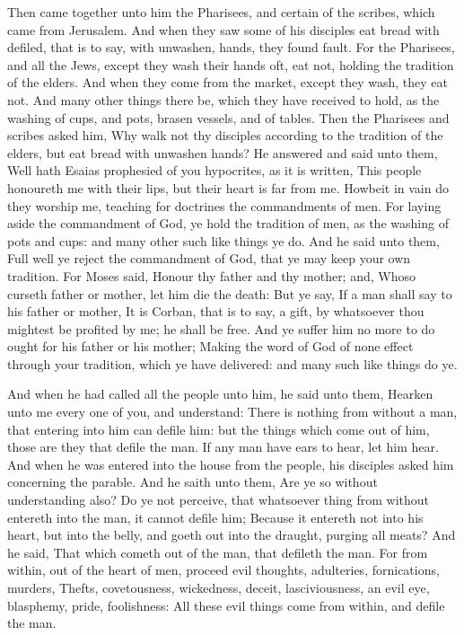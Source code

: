  Then came together unto him the Pharisees, and certain of
the scribes, which came from Jerusalem.  And when they saw
some of his disciples eat bread with defiled, that is to say, with
unwashen, hands, they found fault.  For the Pharisees, and
all the Jews, except they wash their hands oft, eat not, holding the
tradition of the elders.  And when they come from the
market, except they wash, they eat not. And many other things there be,
which they have received to hold, as the washing of cups, and pots,
brasen vessels, and of tables.  Then the Pharisees and
scribes asked him, Why walk not thy disciples according to the tradition
of the elders, but eat bread with unwashen hands?  He
answered and said unto them, Well hath Esaias prophesied of you
hypocrites, as it is written, This people honoureth me with their lips,
but their heart is far from me.  Howbeit in vain do they
worship me, teaching for doctrines the commandments of men. 
For laying aside the commandment of God, ye hold the tradition of men,
as the washing of pots and cups: and many other such like things ye do.
 And he said unto them, Full well ye reject the commandment
of God, that ye may keep your own tradition.  For Moses
said, Honour thy father and thy mother; and, Whoso curseth father or
mother, let him die the death:  But ye say, If a man shall
say to his father or mother, It is Corban, that is to say, a gift, by
whatsoever thou mightest be profited by me; he shall be free.
 And ye suffer him no more to do ought for his father or
his mother;  Making the word of God of none effect through
your tradition, which ye have delivered: and many such like things do
ye.

 And when he had called all the people unto him, he said
unto them, Hearken unto me every one of you, and understand:
 There is nothing from without a man, that entering into
him can defile him: but the things which come out of him, those are they
that defile the man.  If any man have ears to hear, let him
hear.  And when he was entered into the house from the
people, his disciples asked him concerning the parable. 
And he saith unto them, Are ye so without understanding also? Do ye not
perceive, that whatsoever thing from without entereth into the man, it
cannot defile him;  Because it entereth not into his heart,
but into the belly, and goeth out into the draught, purging all meats?
 And he said, That which cometh out of the man, that
defileth the man.  For from within, out of the heart of
men, proceed evil thoughts, adulteries, fornications, murders,
 Thefts, covetousness, wickedness, deceit, lasciviousness,
an evil eye, blasphemy, pride, foolishness:  All these evil
things come from within, and defile the man.


